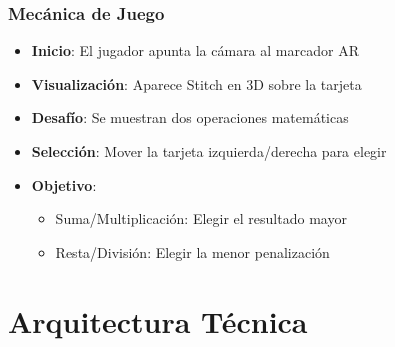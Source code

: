 \documentclass{beamer}
\begin{document}
\begin{frame}
\frametitle{Mecánica de Juego}
\begin{itemize}
    \item<1-> \textbf{Inicio}: El jugador apunta la cámara al marcador AR
    \item<2-> \textbf{Visualización}: Aparece Stitch en 3D sobre la tarjeta
    \item<3-> \textbf{Desafío}: Se muestran dos operaciones matemáticas
    \item<4-> \textbf{Selección}: Mover la tarjeta izquierda/derecha para elegir
    \item<5-> \textbf{Objetivo}: 
    \begin{itemize}
        \item<6-> Suma/Multiplicación: Elegir el resultado mayor
        \item<7-> Resta/División: Elegir la menor penalización
    \end{itemize}
\end{itemize}

\end{frame}

\section{Arquitectura Técnica}
\end{document}
